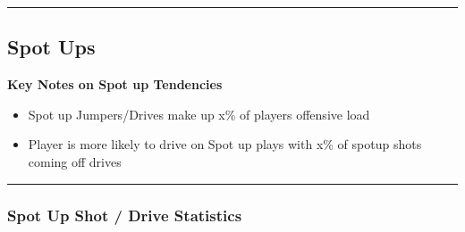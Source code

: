 \documentclass[a4paper,12pt]{article}
\begin{document}
\vspace{-1em} %
\hrule height 1pt width 1\textwidth %
\vspace{1em} %

\clearpage

\subsection{Spot Ups}

\vspace{1.25em} %
\textbf{Key Notes on Spot up Tendencies}
\vspace{0.5em} %

\begin{itemize}
    \item Spot up Jumpers/Drives make up x\% of players offensive load
    \vspace{0.3em} %
    \item Player is more likely to drive on Spot up plays with x\% of spotup shots coming off drives
\end{itemize}

\vspace{1em} %
\hrule height 1pt width 1\textwidth %
\vspace{0em} %

\subsubsection{Spot Up Shot / Drive Statistics}
\end{document}
